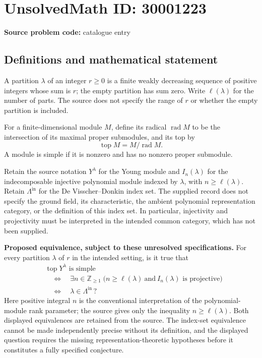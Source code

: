 \documentclass[11pt]{article}
\newcommand{\Z}{\mathbb{Z}}
\begin{document}
\section*{UnsolvedMath ID: 30001223}
\textbf{Source problem code:} catalogue entry
\subsection{Definitions and mathematical statement}
A partition \(\lambda\) of an integer \(r\geq 0\) is a finite weakly decreasing sequence of positive integers whose sum is \(r\); the empty partition has sum zero. Write \(\ell(\lambda)\) for the number of parts. The source does not specify the range of \(r\) or whether the empty partition is included.

For a finite-dimensional module \(M\), define its radical \(\operatorname{rad}M\) to be the intersection of its maximal proper submodules, and its top by
\[
\operatorname{top}M=M/\operatorname{rad}M.
\]
A module is simple if it is nonzero and has no nonzero proper submodule.

Retain the source notation \(Y^\lambda\) for the Young module and \(I_n(\lambda)\) for the indecomposable injective polynomial module indexed by \(\lambda\), with \(n\geq\ell(\lambda)\). Retain \(\Lambda^{\mathrm{in}}\) for the De Visscher--Donkin index set. The supplied record does not specify the ground field, its characteristic, the ambient polynomial representation category, or the definition of this index set. In particular, injectivity and projectivity must be interpreted in the intended common category, which has not been supplied.

\textbf{Proposed equivalence, subject to these unresolved specifications.} For every partition \(\lambda\) of \(r\) in the intended setting, is it true that
\[
\begin{aligned}
&\operatorname{top}Y^\lambda\text{ is simple}\\
&\quad\Longleftrightarrow\quad
\exists n\in\Z_{\geq 1}\;\bigl(n\geq\ell(\lambda)\ \text{and}\ I_n(\lambda)\text{ is projective}\bigr)\\
&\quad\Longleftrightarrow\quad
\lambda\in\Lambda^{\mathrm{in}}\,?
\end{aligned}
\]
Here positive integral \(n\) is the conventional interpretation of the polynomial-module rank parameter; the source gives only the inequality \(n\geq\ell(\lambda)\). Both displayed equivalences are retained from the source. The index-set equivalence cannot be made independently precise without its definition, and the displayed question requires the missing representation-theoretic hypotheses before it constitutes a fully specified conjecture.
\end{document}
